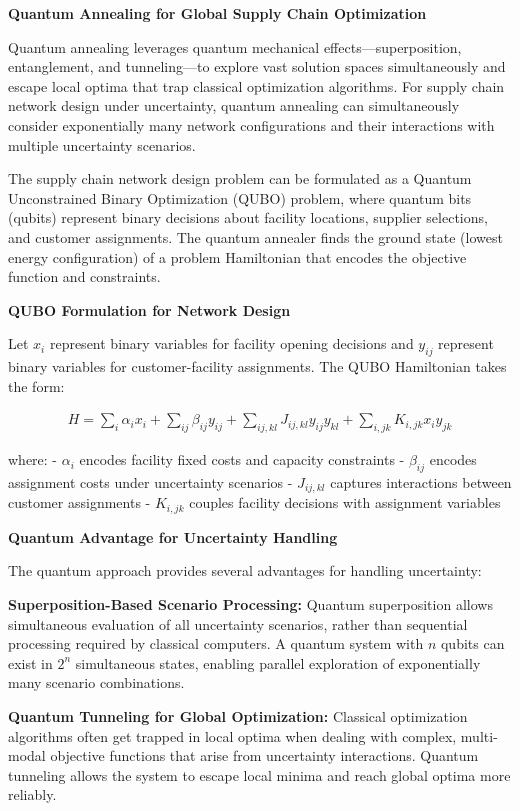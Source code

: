 \documentclass{article}
\begin{document}
\textbf{Quantum Annealing for Global Supply Chain Optimization}

Quantum annealing leverages quantum mechanical effects---superposition, entanglement, and tunneling---to explore vast solution spaces simultaneously and escape local optima that trap classical optimization algorithms. For supply chain network design under uncertainty, quantum annealing can simultaneously consider exponentially many network configurations and their interactions with multiple uncertainty scenarios.

The supply chain network design problem can be formulated as a Quantum Unconstrained Binary Optimization (QUBO) problem, where quantum bits (qubits) represent binary decisions about facility locations, supplier selections, and customer assignments. The quantum annealer finds the ground state (lowest energy configuration) of a problem Hamiltonian that encodes the objective function and constraints.

\textbf{QUBO Formulation for Network Design}

Let $x_i$ represent binary variables for facility opening decisions and $y_{ij}$ represent binary variables for customer-facility assignments. The QUBO Hamiltonian takes the form:

\begin{align}
H = \sum_i \alpha_i x_i + \sum_{ij} \beta_{ij} y_{ij} + \sum_{ij,kl} J_{ij,kl} y_{ij} y_{kl} + \sum_{i,jk} K_{i,jk} x_i y_{jk}
\end{align}

where:
- $\alpha_i$ encodes facility fixed costs and capacity constraints
- $\beta_{ij}$ encodes assignment costs under uncertainty scenarios  
- $J_{ij,kl}$ captures interactions between customer assignments
- $K_{i,jk}$ couples facility decisions with assignment variables

\textbf{Quantum Advantage for Uncertainty Handling}

The quantum approach provides several advantages for handling uncertainty:

\textbf{Superposition-Based Scenario Processing:} Quantum superposition allows simultaneous evaluation of all uncertainty scenarios, rather than sequential processing required by classical computers. A quantum system with $n$ qubits can exist in $2^n$ simultaneous states, enabling parallel exploration of exponentially many scenario combinations.

\textbf{Quantum Tunneling for Global Optimization:} Classical optimization algorithms often get trapped in local optima when dealing with complex, multi-modal objective functions that arise from uncertainty interactions. Quantum tunneling allows the system to escape local minima and reach global optima more reliably.
\end{document}
